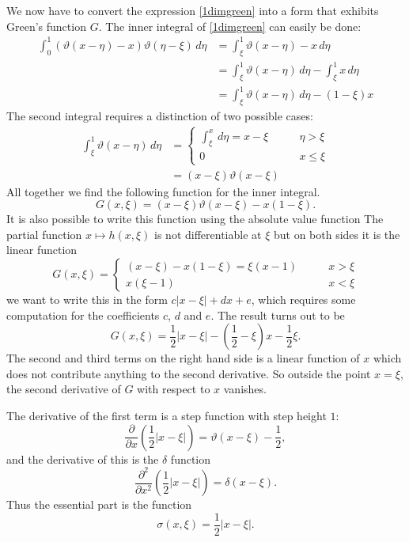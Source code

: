 We now have to convert the expression \eqref{1dimgreen} into a form
that exhibits Green's function $G$.
The inner integral of \eqref{1dimgreen} can easily be done:
\begin{align*}
\int_0^1(\vartheta(x-\eta)-x)\vartheta(\eta-\xi)\,d\eta
&=
\int_\xi^1\vartheta(x-\eta)-x\,d\eta
\\
&=
\int_\xi^1\vartheta(x-\eta)\,d\eta-\int_\xi^1x\,d\eta
\\
&=
\int_\xi^1\vartheta(x-\eta)\,d\eta-(1-\xi)x
\end{align*}
The second integral requires a distinction of two possible cases:
\begin{align*}
\int_\xi^1\vartheta(x-\eta)\,d\eta
&=
\begin{cases}
\int_\xi^x\,d\eta=x-\xi&\qquad\eta>\xi\\
0&\qquad x\le \xi
\end{cases}
\\
&=(x-\xi)\vartheta(x-\xi)
\end{align*}
All together we find the following function for the inner integral.
\[
G(x,\xi)=(x-\xi)\vartheta(x-\xi)-x(1-\xi).
\]
It is also possible to write this function using the 
absolute value function
The partial function $x\mapsto h(x,\xi)$ is not differentiable at $\xi$
but on both sides it is the linear function
\[
G(x,\xi)=\begin{cases}
(x-\xi)-x(1-\xi)=\xi(x-1)&\qquad x>\xi\\
x(\xi-1)&\qquad x<\xi
\end{cases}
\]
we want to write this in the form $c|x-\xi|+dx+e$, which requires
some computation for the coefficients $c$, $d$ and $e$.
The result turns out to be
\[
G(x,\xi)
=
{\textstyle \frac12}|x-\xi|-({\textstyle \frac12}-\xi)x-{\textstyle\frac12}\xi.
\]
The second and third terms on the right hand side is a linear function
of $x$ which does not contribute anything to the second derivative.
So outside the point $x=\xi$, the second derivative of $G$ with respect 
to $x$ vanishes.

The derivative of the first term is a step function with step
height $1$:
\[
\frac{\partial}{\partial x}({\textstyle \frac12}|x-\xi|)
=
\vartheta(x-\xi)
-
{\textstyle\frac12},
\]
and the derivative of this is the $\delta$ function
\[
\frac{\partial^2}{\partial x^2}({\textstyle \frac12}|x-\xi|)
=
\delta(x-\xi).
\]
Thus the essential part is the function
\begin{equation}
\sigma(x,\xi)=\frac12|x-\xi|.
\label{n1sigma}
\end{equation}

